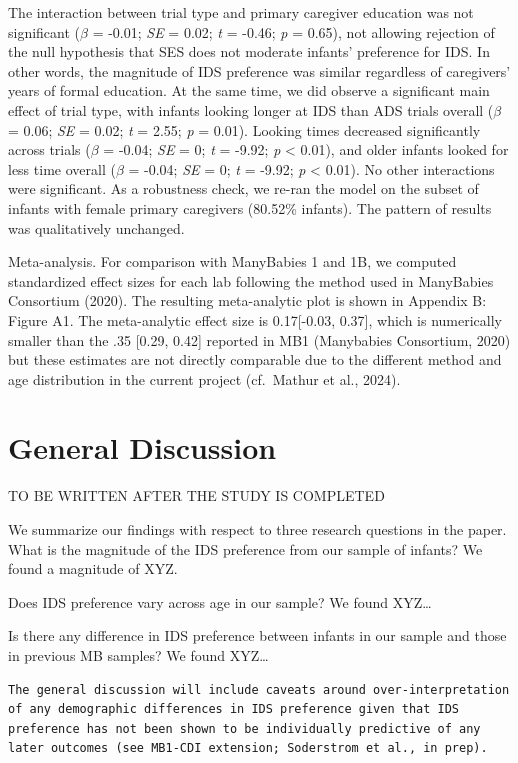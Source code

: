 \documentclass[
  ,man,floatsintext]{apa6}
\begin{document}
The interaction between trial type and primary caregiver education was not significant (\emph{\(\beta\)} = -0.01; \emph{SE} = 0.02; \emph{t} = -0.46; \emph{p} = 0.65), not allowing rejection of the null hypothesis that SES does not moderate infants' preference for IDS. In other words, the magnitude of IDS preference was similar regardless of caregivers' years of formal education. At the same time, we did observe a significant main effect of trial type, with infants looking longer at IDS than ADS trials overall (\emph{\(\beta\)} = 0.06; \emph{SE} = 0.02; \emph{t} = 2.55; \emph{p} = 0.01). Looking times decreased significantly across trials (\emph{\(\beta\)} = -0.04; \emph{SE} = 0; \emph{t} = -9.92; \emph{p} \textless{} 0.01), and older infants looked for less time overall (\emph{\(\beta\)} = -0.04; \emph{SE} = 0; \emph{t} = -9.92; \emph{p} \textless{} 0.01). No other interactions were significant. As a robustness check, we re-ran the model on the subset of infants with female primary caregivers (80.52\% infants). The pattern of results was qualitatively unchanged.

Meta-analysis. For comparison with ManyBabies 1 and 1B, we computed standardized effect sizes for each lab following the method used in ManyBabies Consortium (2020). The resulting meta-analytic plot is shown in Appendix B: Figure A1. The meta-analytic effect size is 0.17{[}-0.03, 0.37{]}, which is numerically smaller than the .35 {[}0.29, 0.42{]} reported in MB1 (Manybabies Consortium, 2020) but these estimates are not directly comparable due to the different method and age distribution in the current project (cf.~Mathur et al., 2024).

\hypertarget{general-discussion}{%
\section{General Discussion}\label{general-discussion}}

TO BE WRITTEN AFTER THE STUDY IS COMPLETED

We summarize our findings with respect to three research questions in the paper.
What is the magnitude of the IDS preference from our sample of infants? We found a magnitude of XYZ.

Does IDS preference vary across age in our sample? We found XYZ\ldots{}

Is there any difference in IDS preference between infants in our sample and those in previous MB samples? We found XYZ\ldots{}

\begin{verbatim}
The general discussion will include caveats around over-interpretation of any demographic differences in IDS preference given that IDS preference has not been shown to be individually predictive of any later outcomes (see MB1-CDI extension; Soderstrom et al., in prep). 
\end{verbatim}
\end{document}
